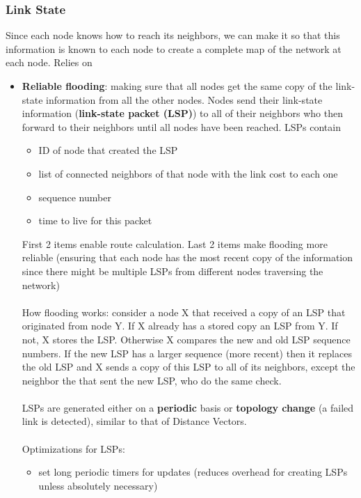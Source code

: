 \documentclass{article}
\begin{document}
  \subsubsection{Link State}
  Since each node knows how to reach its neighbors, we can make it so that this information is known to each node to create a complete map of the network at each node. Relies on
  \begin{itemize}
    \item \textbf{Reliable flooding}: making sure that all nodes get the same copy of the link-state information from all the other nodes. Nodes send their link-state information (\textbf{link-state packet (LSP)}) to all of their neighbors who then forward to their neighbors until all nodes have been reached. LSPs contain
      \begin{itemize}
        \item ID of node that created the LSP
        \item list of connected neighbors of that node with the link cost to each one
        \item sequence number
        \item time to live for this packet
      \end{itemize}
      First 2 items enable route calculation. Last 2 items make flooding more reliable (ensuring that each node has the most recent copy of the information since there might be multiple LSPs from different nodes traversing the network) \\ \\
      How flooding works: consider a node X that received a copy of an LSP that originated from node Y. If X already has a stored copy an LSP from Y. If not, X stores the LSP. Otherwise X compares the new and old LSP sequence numbers. If the new LSP has a larger sequence (more recent) then it replaces the old LSP and X sends a copy of this LSP to all of its neighbors, except the neighbor the that sent the new LSP, who do the same check. \\ \\
      LSPs are generated either on a \textbf{periodic} basis or \textbf{topology change} (a failed link is detected), similar to that of Distance Vectors. \\ \\
      Optimizations for LSPs:
      \begin{itemize}
        \item set long periodic timers for updates (reduces overhead for creating LSPs unless absolutely necessary)

\end{itemize}
\end{itemize}
\end{document}
